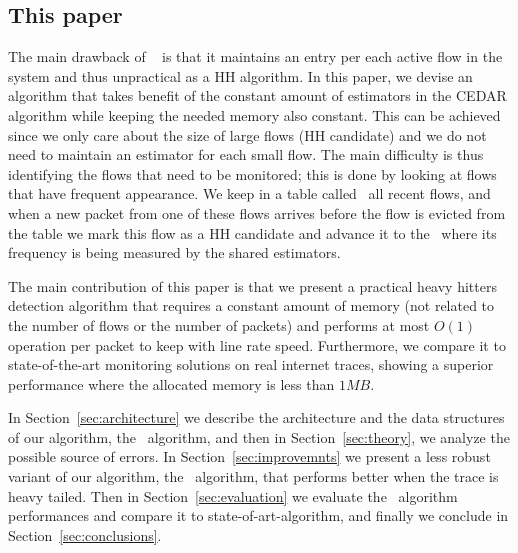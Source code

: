 \subsection{This paper}
The main drawback of ~\cite{CEDAR} is that it maintains an entry per each active flow in the system and thus unpractical as a HH algorithm.
In this paper, we devise an algorithm that takes benefit of the constant amount of estimators in the CEDAR algorithm while keeping the needed memory also constant. This can be achieved since we only care about the size of large flows (HH candidate) and we do not need to maintain an estimator for each small flow. The main difficulty is thus identifying the flows that need to be monitored; this is done by looking at flows that have frequent appearance.  We keep in a table called   \sfa\ all recent flows, and when a new packet from one of these flows arrives before the flow is evicted from the table we mark this flow as a HH candidate and advance it to the \cs\ where its frequency is being measured by the shared estimators. 

The main contribution of this paper is that we present a practical heavy hitters detection algorithm that requires a constant amount of memory (not related to the number of flows or the number of packets) and performs at most $O(1)$ operation per packet to keep with line rate speed. Furthermore, we compare it to state-of-the-art monitoring solutions on real internet traces, showing a superior performance where the allocated memory is less than $1MB$.


In Section~\ref{sec:architecture} we describe the architecture and the data structures of our algorithm, the \cs\ algorithm, and then in Section~\ref{sec:theory}, we analyze  the possible source of errors. In Section~\ref{sec:improvemnts} we present a less robust variant of our algorithm, the \eb\ algorithm, that performs better when the trace is heavy tailed. Then in Section~\ref{sec:evaluation} we evaluate the \cs\ algorithm performances and compare it to state-of-art-algorithm, and finally we conclude in Section~\ref{sec:conclusions}.
